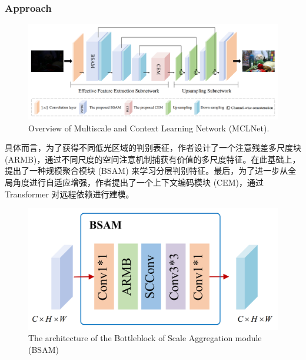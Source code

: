 \documentclass[a4paper]{ctexart}
\begin{document}
	\subsubsection{Approach}
	
	\begin{figure}[htbp]
		\centering 
		\includegraphics[width=\columnwidth]{picture/LLIE/MCLNet/Overview}
		\caption{
			\label{fig: MCLNet Overview} 
			Overview of Multiscale and Context Learning Network (MCLNet).
		}
	\end{figure}
	
	具体而言，为了获得不同低光区域的判别表征，作者设计了一个注意残差多尺度块 (ARMB)，通过不同尺度的空间注意机制捕获有价值的多尺度特征。在此基础上，提出了一种规模聚合模块 (BSAM) 来学习分层判别特征。最后，为了进一步从全局角度进行自适应增强，作者提出了一个上下文编码模块 (CEM)，通过 Transformer 对远程依赖进行建模。
	
	\begin{figure}[htbp]
		\centering 
		\includegraphics[width=0.7\columnwidth]{picture/LLIE/MCLNet/BSAM}
		\caption{
			\label{fig: MCLNet BSAM} 
			The architecture of the Bottleblock of Scale Aggregation module (BSAM)
		}
	\end{figure}
	
\end{document}
